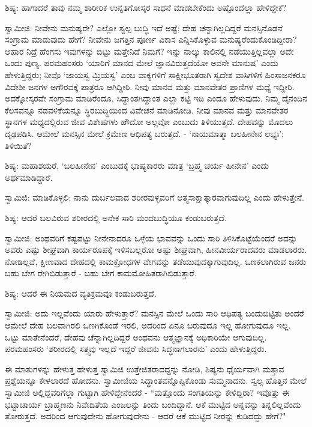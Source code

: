 ಶಿಷ್ಯ: ಹಾಗಾದರೆ ತಾವು ನಮ್ಮ ಶಾರೀರಿಕ ಉನ್ನತಿಗೋಸ್ಕರ ಸಾಧನೆ ಮಾಡಬೇಕೆಂದು ಅಷ್ಟೊಂದೆಲ್ಲಾ ಹೇಳಿದ್ದೇಕೆ?

ಸ್ವಾಮೀಜಿ: ನೀವೇನು ಮನುಷ್ಯರೇ? ಎಲ್ಲೋ ಸ್ವಲ್ಪ ಬುದ್ಧಿ ಇದೆ ಅಷ್ಟೆ; ದೇಹ ಚನ್ನಾಗಿಲ್ಲದಿದ್ದರೆ ಮನಸ್ಸಿನೊಡನೆ ಸಂಗ್ರಾಮ ಮಾಡುವುದು ಹೇಗೆ? ನೀವೇನು ಜಗತ್ತಿನ ಪೂರ್ಣ ವಿಕಾಸ ಎನ್ನಿಸಿಕೊಳ್ಳುವ ಮನುಷ್ಯರೆಂದುಕೊಂಡಿದ್ದೀರಾ? ಆಹಾರ ನಿದ್ರೆ ಹೆಂಗಸು ಇವುಗಳನ್ನು ಬಿಟ್ಟು ಮತ್ತೇನಿದೆ ನಿಮಗೆ? ಇನ್ನು ನಾಲ್ಕು ಕಾಲಿನಲ್ಲಿ ನಡೆಯುತ್ತಿಲ್ಲವಲ್ಲಾ ಅದೇ ಒಂದು ಪುಣ್ಯ. ಪರಮಹಂಸರು ‘ಯಾರಿಗೆ ಮಾನದ ಮೇಲೆ ಜ್ಞಾನವಿರುತ್ತದೆಯೋ ಅವನೇ ಮಾನುಷ’ ಎಂದು ಹೇಳುತ್ತಿದ್ದರು; ನೀವೊ ‘ಜಾಯಸ್ವ ಮ್ರಿಯಸ್ವ’ ಎಂಬ ವಾಕ್ಯಗಳಿಗೆ ಸಾಕ್ಷೀಭೂತರಾಗಿ ಸ್ವದೇಶ ವಾಸಿಗಳಿಗೆ ಹಿಂಸಾಜನಕರೂ ವಿದೇಶೀ ಜನಗಳ ಅಗೌರವಕ್ಕೆ ಪಾತ್ರರೂ ಆಗಿದ್ದೀರಿ. ನೀವು ಮಾನವ ಮತ್ತು ಮಾನವೇತರ ಪ್ರಾಣಿಗಳ ಮಧ್ಯೆ ಇದ್ದೀರಿ. ಅದಕ್ಕೋಸ್ಕರವೇ ಸಂಗ್ರಾಮ ಮಾಡಿರೆಂದೂ, ಸಿದ್ಧಾಂತಗಿದ್ದಾಂತ ಎಲ್ಲಾ ಕಟ್ಟಿ ಇಡಿ ಎಂದೂ ಹೇಳುವುದು. ನಿಮ್ಮ ದೈನಂದಿನ ಕೆಲಸವನ್ನೂ ನಡವಳಿಕೆಯನ್ನೂ ಸ್ಥಿರಬುದ್ಧಿಯಿಂದ ವಿವೇಚನೆ ಮಾಡಿನೋಡಿ. ನೀವು ಮಾನವ ಮತ್ತು ಮಾನವೇತರ ಸ್ಥಾನಗಳ ಮಧ್ಯದಲ್ಲಿರುವ ಜೀವ ವಿಶೇಷಗಳು ಹೌದೋ ಅಲ್ಲವೋ ಎಂಬುದು ತಿಳಿಯುತ್ತದೆ. ದೇಹವನ್ನು ಮೊದಲು ದೃಢಪಡಿಸಿ. ಆಮೇಲೆ ಮನಸ್ಸಿನ ಮೇಲೆ ಕ್ರಮೇಣ ಆಧಿಪತ್ಯ ಬರುತ್ತದೆ. - ‘ನಾಯಮಾತ್ಮಾ ಬಲಹೀನೇನ ಲಭ್ಯಃ’; ತಿಳಿಯಿತೆ?

ಶಿಷ್ಯ: ಮಹಾಶಯರೆ, ‘ಬಲಹೀನೇನ’ ಎಂಬುದಕ್ಕೆ ಭಾಷ್ಯಕಾರರು ಮಾತ್ರ ‘ಬ್ರಹ್ಮ ಚರ್ಯ ಹೀನೇನ’ ಎಂದು ಅರ್ಥಮಾಡಿದ್ದಾರೆ.

ಸ್ವಾಮಿಜಿ: ಮಾಡಿಕೊಳ್ಳಲಿ; ನಾನು ದುರ್ಬಲವಾದ ಶರೀರವುಳ್ಳವರಿಗೆ ಆತ್ಮಸಾಕ್ಷಾತ್ಕಾರವಾಗುವುದಿಲ್ಲ ಎಂದು ಹೇಳುತ್ತೇನೆ.

ಶಿಷ್ಯ: ಆದರೆ ಬಲವಿರುವ ಶರೀರದಲ್ಲಿ ಅನೇಕ ಸಾರಿ ಮಂದಬುದ್ಧಿಯೂ ಕಂಡುಬರುತ್ತದೆ.

ಸ್ವಾಮೀಜಿ: ಅಂಥವರಿಗೆ ಕಷ್ಟಪಟ್ಟು ನೀನೇನಾದರೂ ಒಳ್ಳೆಯ ಭಾವವನ್ನು ಒಂದು ಸಾರಿ ತಿಳಿಸಿಕೊಟ್ಟೆಯೆಂದರೆ ಅದನ್ನು ಅವರು ಎಷ್ಟು ಶೀಘ್ರವಾಗಿ ಕಾರ್ಯರೂಪಕ್ಕೆ ಇಳಿಸಬಲ್ಲರೋ ಅಷ್ಟು ಶೀಘ್ರವಾಗಿ, ಹೀನವೀರ್ಯರಾದವರು ಮಾಡಲಾರರು. ನೋಡಿಲ್ಲವೆ, ಕ್ಷೀಣವಾದ ದೇಹದಲ್ಲಿ ಕಾಮಕ್ರೋಧಗಳ ವೇಗವನ್ನು ತಡೆಯುವುದಕ್ಕಾಗುವುದಿಲ್ಲ. ಒಣಕಲಾಗಿರುವ ಜನರು ಬಹು ಬೇಗ ರೇಗಿಬಿಡುತ್ತಾರೆ - ಬಹು ಬೇಗ ಕಾಮಮೋಹಿತರಾಗಿಬಿಡುತ್ತಾರೆ.

ಶಿಷ್ಯ: ಆದರೆ ಈ ನಿಯಮದ ವ್ಯತಿಕ್ರಮವೂ ಕಂಡುಬರುತ್ತದೆ.

ಸ್ವಾಮೀಜಿ: ಅದು ಇಲ್ಲವೆಂದು ಯಾರು ಹೇಳುತ್ತಾರೆ? ಮನಸ್ಸಿನ ಮೇಲೆ ಒಂದು ಸಾರಿ ಆಧಿಪತ್ಯ ಬಂದುಬಿಟ್ಟಿತು ಅಂದರೆ ಆಮೇಲೆ ದೇಹ ಬಲವಾಗಿರಲಿ ಒಣಗಿಕೊಂಡೆ ಇರಲಿ, ಅದರಿಂದ ಏನೂ ಬರುವುದೂ ಇಲ್ಲ ಹೋಗುವುದೂ ಇಲ್ಲ. ಒಟ್ಟು ಮಾತೇನೆಂದರೆ, ದೇಹವು ಚೆನ್ನಾಗಿಲ್ಲದಿದ್ದರೆ ಅಂಥವನು ಆತ್ಮಜ್ಞಾನಕ್ಕೆ ಅಧಿಕಾರಿಯೇ ಆಗುವುದಿಲ್ಲ. ಪರಮಹಂಸರು ‘ಶರೀರದಲ್ಲಿ ಸತ್ತ್ವವು ಇಲ್ಲದೆ ಇದ್ದರೆ ಜೀವನು ಸಿದ್ಧನಾಗಲಾರನು’ ಎಂದು ಹೇಳುತ್ತಿದ್ದರು.

ಈ ಮಾತುಗಳನ್ನು ಹೇಳುತ್ತ ಹೇಳುತ್ತ ಸ್ವಾಮಿಜಿ ಉತ್ತೇಜಿತರಾದದ್ದನ್ನು ನೋಡಿ, ಶಿಷ್ಯನು ಧೈರ್ಯವಾಗಿ ಮತ್ತಾವ ಪ್ರಶ್ನೆಯನ್ನೂ ಕೇಳಲಾರದೆ ಹೋದನು. ಸ್ವಾಮೀಜಿಯ ಸಿದ್ಧಾಂತವನ್ನೊಪ್ಪಿಕೊಂಡು ಸುಮ್ಮನಾದನು. ಸ್ವಲ್ಪ ಹೊತ್ತಿನ ಮೇಲೆ ಸ್ವಾಮೀಜಿ ಅಲ್ಲಿದ್ದವರಿಗೆಲ್ಲಾ ಗುಟ್ಟಾಗಿ ಹೇಳಿದ್ದೇನೆಂದರೆ - “ಮತ್ತೊಂದು ಸಂಗತಿಯನ್ನು ಕೇಳಿದ್ದಿರಾ? ಇವೊತ್ತು ಈ ಭಟ್ಟಾಚಾರ್ಯ ಬ್ರಾಹ್ಮಣನು ನಿವೇದಿತೆಯ ಎಂಜಲನ್ನು ತಿಂದು ಬಂದಿದ್ದಾನೆ. ಆಕೆ ಮುಟ್ಟಿದ ಅನ್ನವನ್ನು ತಿನ್ನಲಿಲ್ಲವೆಂದು ತೋರುತ್ತದೆ. ಅದರಿಂದ ಆಗುವುದೇನು ಹೋಗುವುದೇನು - ಆದರೆ ಆಕೆ ಮುಟ್ಟಿದ ನೀರನ್ನು ಕುಡಿದದ್ದು ಹೇಗೆ?"

